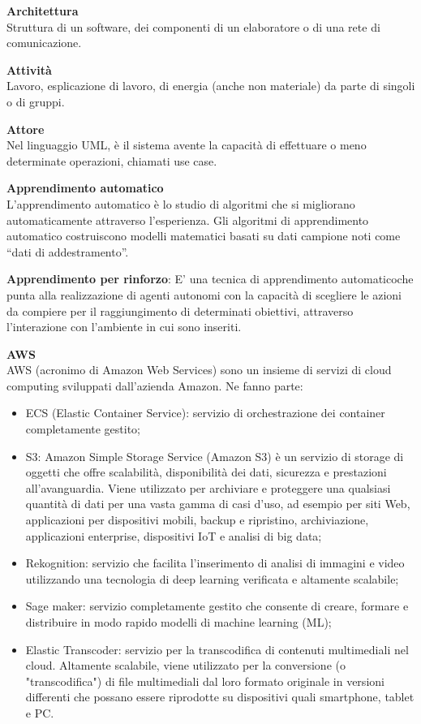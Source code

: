 \documentclass[a4paper, oneside, openany, dvipsnames, table, 12pt]{article}
\begin{document}
\textbf{Architettura} \\
Struttura di un software, dei componenti di un elaboratore o di una rete di comunicazione.

\textbf{Attività} \\
Lavoro, esplicazione di lavoro, di energia (anche non materiale) da parte di singoli o di gruppi.

\textbf{Attore} \\
Nel linguaggio UML, è il sistema avente la capacità di effettuare o meno determinate operazioni, chiamati use case. 

\label{par:appr_auto}
\textbf{Apprendimento automatico} \\ 
L’apprendimento automatico è lo studio di algoritmi che si migliorano automaticamente attraverso l’esperienza. Gli algoritmi di apprendimento automatico costruiscono modelli matematici basati su dati campione noti come “dati di addestramento”.

\textbf{Apprendimento per rinforzo}: 
E’ una tecnica di apprendimento automatico\glo che punta alla realizzazione di agenti autonomi con la capacità di scegliere le azioni da compiere per il raggiungimento di determinati obiettivi, attraverso l’interazione con l’ambiente in cui sono inseriti.	

\textbf{AWS} \\
AWS (acronimo di Amazon Web Services) sono un insieme di servizi di cloud computing sviluppati dall'azienda Amazon. Ne fanno parte: 
\begin{itemize}
\item ECS (Elastic Container Service): servizio di orchestrazione dei container completamente gestito;
\item S3: Amazon Simple Storage Service (Amazon S3) è un servizio di storage di oggetti che offre scalabilità, disponibilità dei dati, sicurezza e prestazioni all'avanguardia. Viene utilizzato per archiviare e proteggere una qualsiasi quantità di dati per una vasta gamma di casi d'uso, ad esempio per siti Web, applicazioni per dispositivi mobili, backup e ripristino, archiviazione, applicazioni enterprise, dispositivi IoT e analisi di big data;
\item Rekognition: servizio che facilita l'inserimento di analisi di immagini e video utilizzando una tecnologia di deep learning verificata e altamente scalabile;
\item Sage maker: servizio completamente gestito che consente di creare, formare e distribuire in modo rapido modelli di machine learning (ML);
\item Elastic Transcoder: servizio per la transcodifica di contenuti multimediali nel cloud. Altamente scalabile, viene utilizzato per la conversione (o "transcodifica") di file multimediali dal loro formato originale in versioni differenti che possano essere riprodotte su dispositivi quali smartphone, tablet e PC.
\end{itemize}
\end{document}
